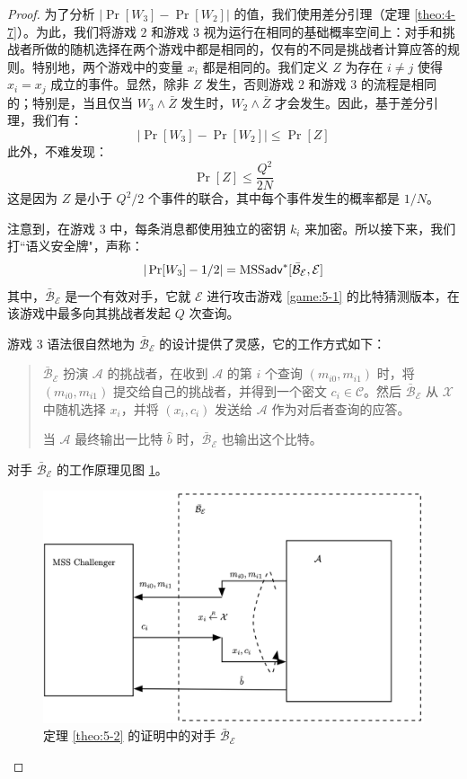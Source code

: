 \begin{proof}
\vspace{5pt}

为了分析 $|\Pr[W_3]-\Pr[W_2]|$ 的值，我们使用差分引理（定理 \ref{theo:4-7}）。为此，我们将游戏 $2$ 和游戏 $3$ 视为运行在相同的基础概率空间上：对手和挑战者所做的随机选择在两个游戏中都是相同的，仅有的不同是挑战者计算应答的规则。特别地，两个游戏中的变量 $x_i$ 都是相同的。我们定义 $Z$ 为存在 $i\neq j$ 使得 $x_i=x_j$ 成立的事件。显然，除非 $Z$ 发生，否则游戏 $2$ 和游戏 $3$ 的流程是相同的；特别是，当且仅当 $W_3\land\bar{Z}$ 发生时，$W_2\land\bar{Z}$ 才会发生。因此，基于差分引理，我们有：
\begin{equation}\label{eq:5-10}
|\Pr[W_3]-\Pr[W_2]|\leq\Pr[Z]
\end{equation}
此外，不难发现：
\begin{equation}\label{eq:5-11}
\Pr[Z]\leq\frac{Q^2}{2N}
\end{equation}
这是因为 $Z$ 是小于 ${Q^2}/{2}$ 个事件的联合，其中每个事件发生的概率都是 ${1}/{N}$。

注意到，在游戏 $3$ 中，每条消息都使用独立的密钥 $k_i$ 来加密。所以接下来，我们打``语义安全牌"，声称：
\begin{equation}\label{eq:5-12}
|\Pr[W_3]-{1}/{2}|={\rm MSS}\mathsf{adv}^*[\mathcal{\bar{B}}_\mathcal{E}, \mathcal{E}]
\end{equation}
其中，$\mathcal{\bar{B}}_\mathcal{E}$ 是一个有效对手，它就 $\mathcal{E}$ 进行攻击游戏 \ref{game:5-1} 的比特猜测版本，在该游戏中最多向其挑战者发起 $Q$ 次查询。

游戏 $3$ 语法很自然地为 $\mathcal{\bar{B}}_\mathcal{E}$ 的设计提供了灵感，它的工作方式如下：
\begin{quote}
$\mathcal{\bar{B}}_\mathcal{E}$ 扮演 $\mathcal{A}$ 的挑战者，在收到 $\mathcal{A}$ 的第 $i$ 个查询 $(m_{i0},m_{i1})$ 时，将 $(m_{i0},m_{i1})$ 提交给自己的挑战者，并得到一个密文 $c_i\in\mathcal{C}$。然后 $\mathcal{\bar{B}}_\mathcal{E}$ 从 $\mathcal{X}$ 中随机选择 $x_i$，并将 $(x_i,c_i)$ 发送给 $\mathcal{A}$ 作为对后者查询的应答。

当 $\mathcal{A}$ 最终输出一比特 $\hat{b}$ 时，$\mathcal{\bar{B}}_\mathcal{E}$ 也输出这个比特。
\end{quote}
对手 $\mathcal{\bar{B}}_\mathcal{E}$ 的工作原理见图 \ref{fig:5-2}。

\begin{figure}
  \centering
  \includegraphics[width=0.8\linewidth]{figures/chapter5/fig2.png}
  \caption{定理 \ref{theo:5-2} 的证明中的对手 $\mathcal{\bar{B}}_\mathcal{E}$}
  \label{fig:5-2}
\end{figure}


\end{proof}

